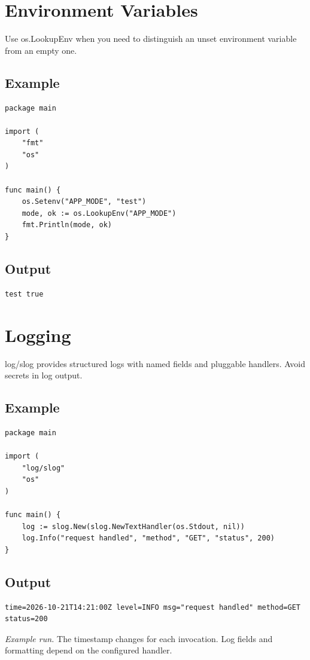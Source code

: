 \documentclass[10pt,oneside]{article}
\newcommand{\sectionline}{\par\vspace{4pt}{\color{rule}\hrule height .5pt}\vspace{7pt}\color{ink}\noindent}
\begin{document}
\section{Environment Variables}
\sectionline
Use os.LookupEnv when you need to distinguish an unset environment variable from an empty one.\par
\subsection*{Example}
\begin{lstlisting}[style=gocode]
package main

import (
	"fmt"
	"os"
)

func main() {
	os.Setenv("APP_MODE", "test")
	mode, ok := os.LookupEnv("APP_MODE")
	fmt.Println(mode, ok)
}
\end{lstlisting}
\subsection*{Output}
\begin{lstlisting}[style=terminal]
test true
\end{lstlisting}
\clearpage
\section{Logging}
\sectionline
log/slog provides structured logs with named fields and pluggable handlers. Avoid secrets in log output.\par
\subsection*{Example}
\begin{lstlisting}[style=gocode]
package main

import (
	"log/slog"
	"os"
)

func main() {
	log := slog.New(slog.NewTextHandler(os.Stdout, nil))
	log.Info("request handled", "method", "GET", "status", 200)
}
\end{lstlisting}


\subsection*{Output}
\begin{lstlisting}[style=terminal]
time=2026-10-21T14:21:00Z level=INFO msg="request handled" method=GET status=200
\end{lstlisting}
\emph{Example run.} The timestamp changes for each invocation. Log fields and formatting depend on the configured handler.
\clearpage
\end{document}
